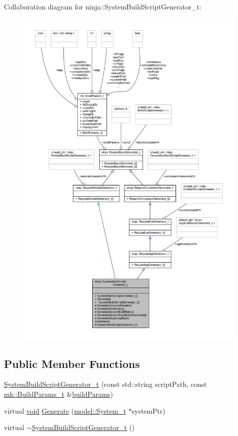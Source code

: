 Collaboration diagram for ninja\+:\+:System\+Build\+Script\+Generator\+\_\+t\+:
\nopagebreak
\begin{figure}[H]
\begin{center}
\leavevmode
\includegraphics[width=350pt]{classninja_1_1_system_build_script_generator__t__coll__graph}
\end{center}
\end{figure}
\subsection*{Public Member Functions}
\begin{DoxyCompactItemize}
\item 
\hyperlink{classninja_1_1_system_build_script_generator__t_a7664d6656d6d62d0da163c232e53626d}{System\+Build\+Script\+Generator\+\_\+t} (const std\+::string script\+Path, const \hyperlink{structmk_1_1_build_params__t}{mk\+::\+Build\+Params\+\_\+t} \&\hyperlink{structninja_1_1_require_base_generator__t_a78d7cecd653f49f8ad74fdbb65343705}{build\+Params})
\item 
virtual \hyperlink{_t_e_m_p_l_a_t_e__cdef_8h_ac9c84fa68bbad002983e35ce3663c686}{void} \hyperlink{classninja_1_1_system_build_script_generator__t_a67ddccc115345edacb5ad3327dfda092}{Generate} (\hyperlink{structmodel_1_1_system__t}{model\+::\+System\+\_\+t} $\ast$system\+Ptr)
\item 
virtual \hyperlink{classninja_1_1_system_build_script_generator__t_a0320a52e315ae0ea904eff047bfeab48}{$\sim$\+System\+Build\+Script\+Generator\+\_\+t} ()
\end{DoxyCompactItemize}
